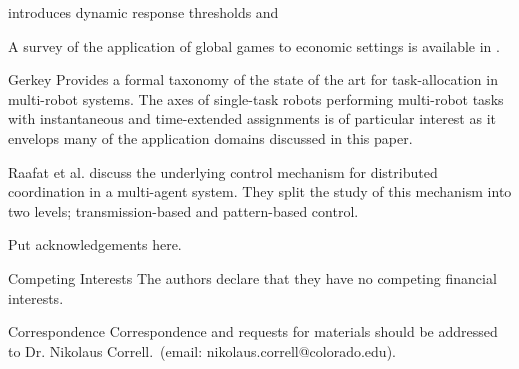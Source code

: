 \documentclass{nature}
\begin{document}
\cite{Theraulaz1998} introduces dynamic response thresholds and \cite{Bonabeau1998}

\cite{Martinoli1999}

\cite{Bonabeau2000}

\cite{Krieger2000}

\cite{Kube2000}

A survey of the application of global games to economic settings is available in \cite{Morris2000}.

\cite{Pynadath2002}

\cite{Conradt2003}

\cite{Mataric2003}

\cite{Gerkey2003}

Gerkey \cite{Gerkey2004} Provides a formal taxonomy of the state of the art for task-allocation in multi-robot systems. The axes of single-task robots performing multi-robot tasks with instantaneous and time-extended assignments is of particular interest as it envelops many of the application domains discussed in this paper.

\cite{Conradt2005}

Raafat et al. \cite{Raafat2009} discuss the underlying control mechanism for distributed coordination in a multi-agent system. They split the study of this mechanism into two levels; transmission-based and pattern-based control. 

\cite{Yoshida2010}

\cite{Suzuki2015}






\begin{addendum}
 \item Put acknowledgements here.
 \item[Competing Interests] The authors declare that they have no
competing financial interests.
 \item[Correspondence] Correspondence and requests for materials
should be addressed to Dr. Nikolaus Correll.~(email: nikolaus.correll@colorado.edu).
\end{addendum}

\end{document}
